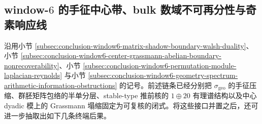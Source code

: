 \subsection{window-\texorpdfstring{$6$}{6} 的手征中心带、bulk 数域不可再分性与奇素响应线}\label{subsec:conclusion-window6-chiral-bulk-flag-oddprime-rigidity}

沿用小节 \ref{subsec:conclusion-window6-matrix-shadow-boundary-walsh-duality}、小节 \ref{subsec:conclusion-window6-center-grassmann-abelian-boundary-nonrecoverability}、小节 \ref{subsec:conclusion-window6-permutation-module-laplacian-reynolds} 与小节 \ref{subsec:conclusion-window6-geometry-spectrum-arithmetic-information-obstructions} 的记号。前述链条已经分别把 \(\sigma_{\mathrm{geo}}\) 的手征压缩、群胚矩阵包络的半单分层、stable-type 推前核的 \(1\oplus 20\) 有理谱结构以及中心 dyadic 模上的 Grassmann 塌缩固定为可复核的闭式。将这些接口并置之后，还可进一步抽取出如下几条终端后果。

